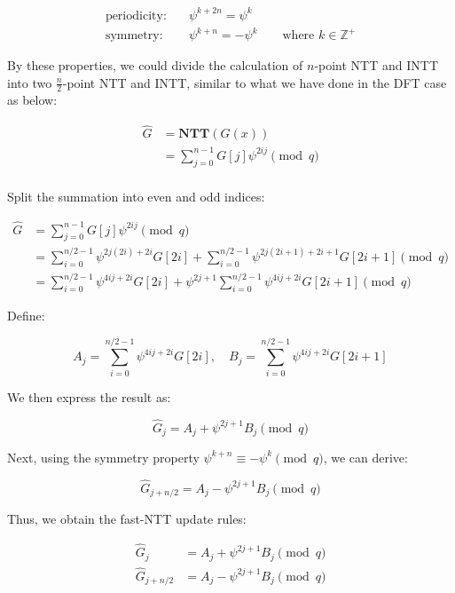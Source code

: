 \documentclass[12pt]{article}
\begin{document}
\begin{align*}
    \text{periodicity:}& \quad \psi^{k + 2n} = \psi^k \\
    \text{symmetry:}& \quad \psi^{k + n} = -\psi^k \qquad \text{where } k \in \mathbb{Z}^+
\end{align*}

By these properties, 
we could divide the calculation of $n$-point NTT and INTT into two $\frac{n}{2}$-point NTT and INTT, 
similar to what we have done in the DFT case as below:

\begin{align*}
    \hat{G} 
    &= \mathbf{NTT}(G(x)) \\
    &= \sum_{j = 0}^{n - 1} G[j] \psi^{2 i j} \pmod{q} \\
\end{align*}

Split the summation into even and odd indices:

\begin{align*}
    \hat{G} 
    &= \sum_{j = 0}^{n - 1} G[j] \psi^{2 i j} \pmod{q} \\
    &= \sum_{i = 0}^{n/2 - 1} \psi^{2j(2i) + 2i} G[2i] + \sum_{i = 0}^{n/2 - 1} \psi^{2j(2i+1) + 2i+1} G[2i+1] \pmod{q} \\
    &= \sum_{i = 0}^{n/2 - 1} \psi^{4ij + 2i} G[2i] + \psi^{2j + 1} \sum_{i = 0}^{n/2 - 1} \psi^{4ij + 2i} G[2i+1] \pmod{q}
\end{align*}

Define:

\begin{equation*}
    A_j = \sum_{i = 0}^{n/2 - 1} \psi^{4ij + 2i} G[2i], \quad B_j = \sum_{i = 0}^{n/2 - 1} \psi^{4ij + 2i} G[2i+1]
\end{equation*}

We then express the result as:

\begin{equation*}
    \hat{G}_j = A_j + \psi^{2j + 1} B_j \pmod{q}
\end{equation*}

Next, using the symmetry property $\psi^{k + n} \equiv -\psi^k \pmod{q}$, we can derive:

\begin{equation*}
    \hat{G}_{j + n/2} = A_j - \psi^{2j + 1} B_j \pmod{q}
\end{equation*}

Thus, we obtain the fast-NTT update rules:

\begin{align*}
    \hat{G}_j &= A_j + \psi^{2j+1} B_j \pmod{q} \\
    \hat{G}_{j + n/2} &= A_j - \psi^{2j+1} B_j \pmod{q}
\end{align*}
\end{document}
